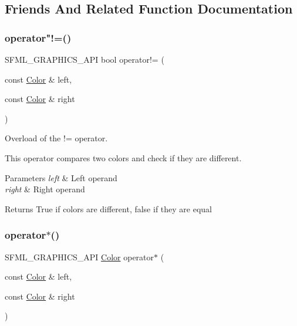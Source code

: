\subsection{Friends And Related Function Documentation}
\mbox{\label{classsf_1_1_color_a5d6501b7dd05f481b79f7163899f1d92}} 
\subsubsection{\texorpdfstring{operator"!=()}{operator!=()}}
{\footnotesize\ttfamily S\+F\+M\+L\+\_\+\+G\+R\+A\+P\+H\+I\+C\+S\+\_\+\+A\+PI bool operator!= (\begin{DoxyParamCaption}\item[{const \mbox{\hyperlink{classsf_1_1_color}{Color}} \&}]{left,  }\item[{const \mbox{\hyperlink{classsf_1_1_color}{Color}} \&}]{right }\end{DoxyParamCaption})\hspace{0.3cm}{\ttfamily [related]}}



Overload of the != operator. 

This operator compares two colors and check if they are different.


\begin{DoxyParams}{Parameters}
{\em left} & Left operand \\
\hline
{\em right} & Right operand\\
\hline
\end{DoxyParams}
\begin{DoxyReturn}{Returns}
True if colors are different, false if they are equal \begin{DoxyVerb}\end{DoxyVerb}
 
\end{DoxyReturn}
\mbox{\label{classsf_1_1_color_aa9de267d831b4ec8ba65b627e51d50c3}} 
\subsubsection{\texorpdfstring{operator$\ast$()}{operator*()}}
{\footnotesize\ttfamily S\+F\+M\+L\+\_\+\+G\+R\+A\+P\+H\+I\+C\+S\+\_\+\+A\+PI \mbox{\hyperlink{classsf_1_1_color}{Color}} operator$\ast$ (\begin{DoxyParamCaption}\item[{const \mbox{\hyperlink{classsf_1_1_color}{Color}} \&}]{left,  }\item[{const \mbox{\hyperlink{classsf_1_1_color}{Color}} \&}]{right }\end{DoxyParamCaption})\hspace{0.3cm}{\ttfamily [related]}}



